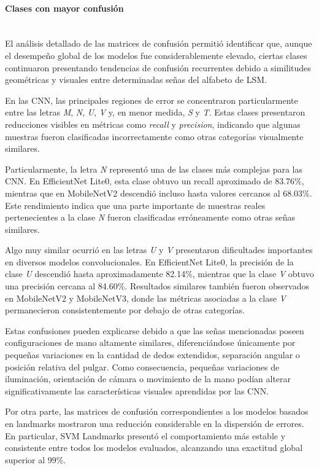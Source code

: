 	
	\paragraph{Clases con mayor confusión}\mbox{}\\
	
	El análisis detallado de las matrices de confusión permitió identificar que, aunque el desempeño global de los modelos fue considerablemente elevado, ciertas clases continuaron presentando tendencias de confusión recurrentes debido a similitudes geométricas y visuales entre determinadas señas del alfabeto de LSM.
	
	En las CNN, las principales regiones de error se concentraron particularmente entre las letras \textit{M}, \textit{N}, \textit{U}, \textit{V} y, en menor medida, \textit{S} y \textit{T}. Estas clases presentaron reducciones visibles en métricas como \textit{recall} y \textit{precision}, indicando que algunas muestras fueron clasificadas incorrectamente como otras categorías visualmente similares.
	
	Particularmente, la letra \textit{N} representó una de las clases más complejas para las CNN. En EfficientNet Lite0, esta clase obtuvo un recall aproximado de 83.76\%, mientras que en MobileNetV2 descendió incluso hasta valores cercanos al 68.03\%. Este rendimiento indica que una parte importante de muestras reales pertenecientes a la clase \textit{N} fueron clasificadas erróneamente como otras señas similares.
	
	Algo muy similar ocurrió en las letras \textit{U} y \textit{V} presentaron dificultades importantes en diversos modelos convolucionales. En EfficientNet Lite0, la precisión de la clase \textit{U} descendió hasta aproximadamente 82.14\%, mientras que la clase \textit{V} obtuvo una precisión cercana al 84.60\%. Resultados similares también fueron observados en MobileNetV2 y MobileNetV3, donde las métricas asociadas a la clase \textit{V} permanecieron consistentemente por debajo de otras categorías.
	
	Estas confusiones pueden explicarse debido a que las señas mencionadas poseen configuraciones de mano altamente similares, diferenciándose únicamente por pequeñas variaciones en la cantidad de dedos extendidos, separación angular o posición relativa del pulgar. Como consecuencia, pequeñas variaciones de iluminación, orientación de cámara o movimiento de la mano podían alterar significativamente las características visuales aprendidas por las CNN.
	
	Por otra parte, las matrices de confusión correspondientes a los modelos basados en landmarks mostraron una reducción considerable en la dispersión de errores. En particular, SVM Landmarks presentó el comportamiento más estable y consistente entre todos los modelos evaluados, alcanzando una exactitud global superior al 99\%.
	
